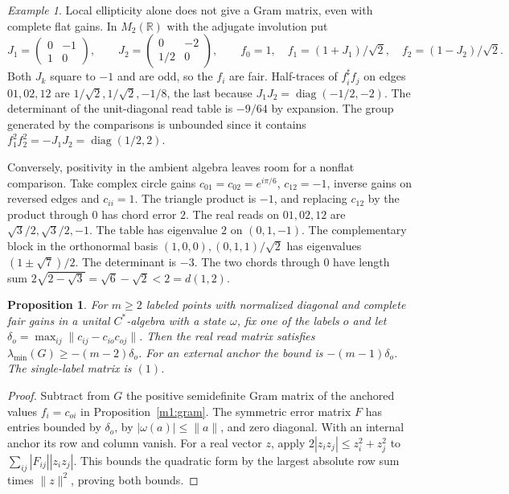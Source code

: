 \documentclass[11pt,reqno]{amsart}
\newtheorem{proposition}[theorem]{Proposition}
\theoremstyle{definition}
\theoremstyle{remark}
\newtheorem{example}[theorem]{Example}
\numberwithin{equation}{section}
\begin{document}
\begin{example}\label{m1:negative-gram}
Local ellipticity alone does not give a Gram matrix, even
with complete flat gains. In \(M_2(\mathbb R)\) with the
adjugate involution put
\[
 J_1=\begin{pmatrix}0&-1\\1&0\end{pmatrix},\qquad
 J_2=\begin{pmatrix}0&-2\\1/2&0\end{pmatrix},\qquad
 f_0=1,\quad f_1=(1+J_1)/\sqrt2,\quad f_2=(1-J_2)/\sqrt2 .
\]
Both \(J_k\) square to \(-1\) and are odd, so the \(f_i\) are
fair. Half-traces of \(f_i^\sharp f_j\) on edges \(01,02,12\)
are \(1/\sqrt2,1/\sqrt2,-1/8\), the last because
\(J_1J_2=\operatorname{diag}(-1/2,-2)\). The determinant
of the unit-diagonal read table is \(-9/64\) by expansion.
The group generated by the comparisons is unbounded since
it contains \(f_1^2 f_2^2=-J_1J_2=\operatorname{diag}(1/2,2)\).

Conversely, positivity in the ambient algebra leaves room
for a nonflat comparison. Take complex circle gains
\(c_{01}=c_{02}=e^{i\pi/6}\), \(c_{12}=-1\), inverse gains on
reversed edges and \(c_{ii}=1\). The triangle product is
\(-1\), and replacing \(c_{12}\) by the product through \(0\)
has chord error \(2\). The real reads on \(01,02,12\) are
\(\sqrt3/2,\sqrt3/2,-1\). The table has eigenvalue \(2\)
on \((0,1,-1)\). The complementary block in the orthonormal
basis \((1,0,0),(0,1,1)/\sqrt2\) has eigenvalues
\((1\pm\sqrt7)/2\). The determinant is \(-3\). The two
chords through \(0\) have length sum
\(2\sqrt{2-\sqrt3}=\sqrt6-\sqrt2<2=d(1,2)\).
\end{example}

\begin{proposition}\label{m1:near-gram}
For \(m\ge2\) labeled points with normalized diagonal and complete
fair gains in a unital \(C^*\)-algebra with a state \(\omega\),
fix one of the labels \(o\) and let
\(\delta_o=\max_{ij}\|c_{ij}-c_{io}c_{oj}\|\).
Then the real read matrix satisfies
\(\lambda_{\min}(G)\ge -(m-2)\delta_o\).
For an external anchor the bound is \(-(m-1)\delta_o\).
The single-label matrix is \((1)\).
\end{proposition}
\begin{proof}
Subtract from \(G\) the positive semidefinite Gram matrix of
the anchored values \(f_i=c_{oi}\) in Proposition~\ref{m1:gram}.
The symmetric error matrix \(F\) has entries bounded by
\(\delta_o\), by \(|\omega(a)|\le\|a\|\), and zero diagonal.
With an internal anchor its row and column vanish. For a
real vector \(z\), apply \(2|z_i z_j|\le z_i^2+z_j^2\) to
\(\sum_{ij}|F_{ij}||z_i z_j|\).
This bounds the quadratic form by the largest absolute row sum
times \(\|z\|^2\), proving both bounds.
\end{proof}
\end{document}
